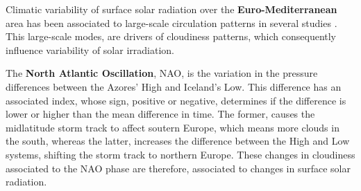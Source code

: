 

Climatic variability of surface solar radiation over the \textbf{Euro-Mediterranean} area has been associated to large-scale circulation patterns in several studies \cite*{Jerez2013a, Chiacchio2010, Sanchez-Lorenzo2009, Pozo-Vazquez2004}. This large-scale modes, are drivers of cloudiness patterns, which consequently influence variability of solar irradiation.

The \textbf{North Atlantic Oscillation}, NAO, is the variation in the pressure differences between the Azores' High and Iceland's Low. This difference has an associated index, whose sign, positive or negative, determines if the difference is lower or higher than the mean difference in time. The former, causes the midlatitude storm track to affect soutern Europe, which means more clouds in the south, whereas the latter, increases the difference between the High and Low systems, shifting the storm track to northern Europe. These changes in cloudiness associated to the NAO phase are therefore, associated to changes in surface solar radiation.

